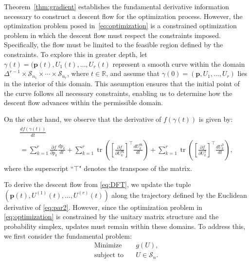 \documentclass[onefignum,onetabnum]{siamart220329}
\begin{document}
    
    
    
    
    
    
    
    Theorem~\ref{thm:gradient} establishes the fundamental derivative information necessary to construct a descent flow for the optimization process. However, the optimization problem posed in~\eqref{eq:optimization} is a constrained optimization problem in which the descent flow must respect the constraints imposed. Specifically, the flow must be limited to the feasible region defined by the constraints. To explore this in greater depth, let $\gamma(t) = (\mathbf{p}(t), U_{1}(t), \ldots, U_{r}(t)$ represent a smooth curve within the domain $ \Delta^{r-1} \times \mathcal{S}_{n_1} \times \cdots \times \mathcal{S}_{n_r} $, where $t \in \mathbb{R}$, and assume that $ \gamma(0) = (\mathbf{p}, U_{1}, \ldots, U_{r}) $ lies in the interior of this domain. This assumption ensures that the initial point of the curve follows all necessary constraints, enabling us to determine how the descent flow advances within the permissible domain. 
    
    On the other hand, we  observe that the derivative of $f(\gamma(t))$ %
    is given by:  
    \begin{align}\label{eq:DFT}
    \begin{array}{l}
    \frac{d f(\gamma(t))}{dt}\\
    = %
    \sum_{k=1}^{r} \frac{\partial f}{\partial p_k} \frac{d p_k}{dt} 
    + \sum_{k=1}^{r} \operatorname{tr}\left(\left[\frac{\partial f}{\partial U_k^\mathfrak{R}}\right]^\top \frac{d U_k^\mathfrak{R}}{dt} \right) 
    + \sum_{k=1}^{r} \operatorname{tr}\left(\left[\frac{\partial f}{\partial U_k^\mathfrak{I}}\right]^\top \frac{d U_k^\mathfrak{I}}{dt} \right),%
    \end{array}
    \end{align}
    where the superscript ``$\top$" denotes the transpose of the matrix.
    
    To derive the descent flow from \eqref{eq:DFT}, we update the tuple $(\mathbf{p}(t), U^{(1)}(t), \ldots, U^{(r)}(t))$ along the trajectory defined by the Euclidean derivative of \eqref{eq:par2}. However, since the optimization problem in \eqref{eq:optimization} is constrained by the unitary matrix structure and the probability simplex, updates must remain within these domains. To address this, we first consider the fundamental problem:  
    \begin{subequations}\label{eq:fundamental}
    \begin{align}
    \mbox{Minimize} & \quad g(U), \label{eq:fundamental1} \\
    \mbox{subject to} & \quad U \in  \mathcal{S}_{n}.\label{eq:fundamental2} 
    \end{align}
    \end{subequations}
    
\end{document}

